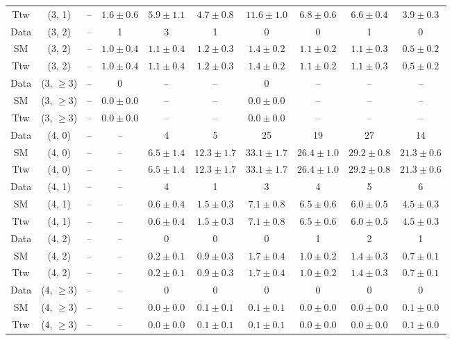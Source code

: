\begin{table}[h!]
{\begin{tabular}{cccccccccc}
	Ttw & (3, 1) & -- & $1.6\pm 0.6$ & $5.9\pm 1.1$ & $4.7\pm 0.8$ & $11.6\pm 1.0$ & $6.8\pm 0.6$ & $6.6\pm 0.4$ & $3.9\pm 0.3$ \\[0.5ex] 
	Data & (3, 2) & -- & 1 & 3 & 1 & 0 & 0 & 1 & 0 \\[0.5ex] 
	SM & (3, 2) & -- & $1.0\pm 0.4$ & $1.1\pm 0.4$ & $1.2\pm 0.3$ & $1.4\pm 0.2$ & $1.1\pm 0.2$ & $1.1\pm 0.3$ & $0.5\pm 0.2$ \\[0.5ex] 
	Ttw & (3, 2) & -- & $1.0\pm 0.4$ & $1.1\pm 0.4$ & $1.2\pm 0.3$ & $1.4\pm 0.2$ & $1.1\pm 0.2$ & $1.1\pm 0.3$ & $0.5\pm 0.2$ \\[0.5ex] 
	Data & (3, $\ge3$) & -- & 0 & -- & -- & 0 & -- & -- & -- \\[0.5ex] 
	SM & (3, $\ge3$) & -- & $0.0\pm 0.0$ & -- & -- & $0.0\pm 0.0$ & -- & -- & -- \\[0.5ex] 
	Ttw & (3, $\ge3$) & -- & $0.0\pm 0.0$ & -- & -- & $0.0\pm 0.0$ & -- & -- & -- \\[0.5ex] 
	Data & (4, 0) & -- & -- & 4 & 5 & 25 & 19 & 27 & 14 \\[0.5ex] 
	SM & (4, 0) & -- & -- & $6.5\pm 1.4$ & $12.3\pm 1.7$ & $33.1\pm 1.7$ & $26.4\pm 1.0$ & $29.2\pm 0.8$ & $21.3\pm 0.6$ \\[0.5ex] 
	Ttw & (4, 0) & -- & -- & $6.5\pm 1.4$ & $12.3\pm 1.7$ & $33.1\pm 1.7$ & $26.4\pm 1.0$ & $29.2\pm 0.8$ & $21.3\pm 0.6$ \\[0.5ex] 
	Data & (4, 1) & -- & -- & 4 & 1 & 3 & 4 & 5 & 6 \\[0.5ex] 
	SM & (4, 1) & -- & -- & $0.6\pm 0.4$ & $1.5\pm 0.3$ & $7.1\pm 0.8$ & $6.5\pm 0.6$ & $6.0\pm 0.5$ & $4.5\pm 0.3$ \\[0.5ex] 
	Ttw & (4, 1) & -- & -- & $0.6\pm 0.4$ & $1.5\pm 0.3$ & $7.1\pm 0.8$ & $6.5\pm 0.6$ & $6.0\pm 0.5$ & $4.5\pm 0.3$ \\[0.5ex] 
	Data & (4, 2) & -- & -- & 0 & 0 & 0 & 1 & 2 & 1 \\[0.5ex] 
	SM & (4, 2) & -- & -- & $0.2\pm 0.1$ & $0.9\pm 0.3$ & $1.7\pm 0.4$ & $1.0\pm 0.2$ & $1.4\pm 0.3$ & $0.7\pm 0.1$ \\[0.5ex] 
	Ttw & (4, 2) & -- & -- & $0.2\pm 0.1$ & $0.9\pm 0.3$ & $1.7\pm 0.4$ & $1.0\pm 0.2$ & $1.4\pm 0.3$ & $0.7\pm 0.1$ \\[0.5ex] 
	Data & (4, $\ge3$) & -- & -- & 0 & 0 & 0 & 0 & 0 & 0 \\[0.5ex] 
	SM & (4, $\ge3$) & -- & -- & $0.0\pm 0.0$ & $0.1\pm 0.1$ & $0.1\pm 0.1$ & $0.0\pm 0.0$ & $0.0\pm 0.0$ & $0.1\pm 0.0$ \\[0.5ex] 
	Ttw & (4, $\ge3$) & -- & -- & $0.0\pm 0.0$ & $0.1\pm 0.1$ & $0.1\pm 0.1$ & $0.0\pm 0.0$ & $0.0\pm 0.0$ & $0.1\pm 0.0$ \\[0.5ex] 

\end{tabular}}
\end{table}
